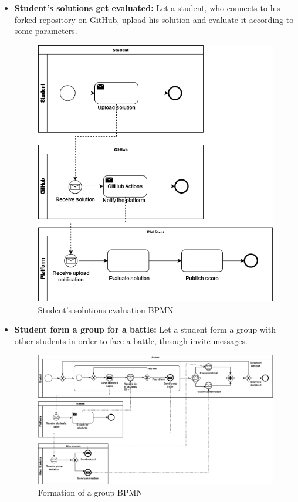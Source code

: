 \documentclass{article}
\begin{document}
{\begin{itemize}
            \item \textbf{Student's solutions get evaluated:} Let a student, who connects to his forked repository on GitHub, upload his solution and evaluate it according to some parameters.
            \begin{figure}[H]
                \centering
                \includegraphics[scale=0.4]{images/BPMN/BPMN6.png}
                \caption{Student's solutions evaluation BPMN}
                \label{fig:studSolEvalBPMN}
            \end{figure}

            \item \textbf{Student form a group for a battle:} Let a student form a group with other students in order to face a battle, through invite messages.
            \begin{figure}[H]
                \centering
                \hspace*{-1.85cm}\includegraphics[scale=0.4]{images/BPMN/BPMN7.png}
                \caption{Formation of a group BPMN}
                \label{fig:groupFormationBPMN}
            \end{figure}
        \end{itemize}

}
\end{document}
